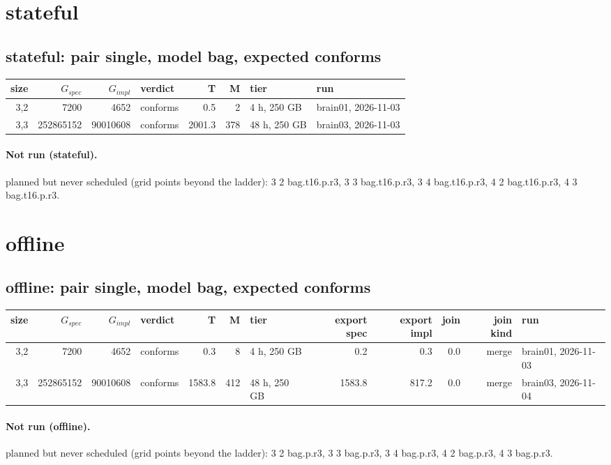 \documentclass[10pt]{article}
\begin{document}
\section*{stateful}
\subsection*{stateful: pair \textsf{single}, model bag, expected conforms}
\begin{longtable}{@{}rrrlrrll@{}}
\toprule
size & $G_{\mathit{spec}}$ & $G_{\mathit{impl}}$ & verdict & T & M & tier & run \\
\midrule
\endhead
\color{blue} 3,2 & 7200 & 4652 & conforms & 0.5 & 2 & 4 h, 250 GB & brain01, 2026-11-03 \\
\color{blue} 3,3 & 252865152 & 90010608 & conforms & 2001.3 & 378 & 48 h, 250 GB & brain03, 2026-11-03 \\
\bottomrule
\end{longtable}
\paragraph{Not run (stateful).}
planned but never scheduled (grid points beyond the ladder): 3 2 bag.t16.p.r3, 3 3 bag.t16.p.r3, 3 4 bag.t16.p.r3, 4 2 bag.t16.p.r3, 4 3 bag.t16.p.r3.\par
\section*{offline}
\subsection*{offline: pair \textsf{single}, model bag, expected conforms}
\begin{longtable}{@{}rrrlrrlrrrrl@{}}
\toprule
size & $G_{\mathit{spec}}$ & $G_{\mathit{impl}}$ & verdict & T & M & tier & export spec & export impl & join & join kind & run \\
\midrule
\endhead
\color{blue} 3,2 & 7200 & 4652 & conforms & 0.3 & 8 & 4 h, 250 GB & 0.2 & 0.3 & 0.0 & merge & brain01, 2026-11-03 \\
\color{blue} 3,3 & 252865152 & 90010608 & conforms & 1583.8 & 412 & 48 h, 250 GB & 1583.8 & 817.2 & 0.0 & merge & brain03, 2026-11-04 \\
\bottomrule
\end{longtable}
\paragraph{Not run (offline).}
planned but never scheduled (grid points beyond the ladder): 3 2 bag.p.r3, 3 3 bag.p.r3, 3 4 bag.p.r3, 4 2 bag.p.r3, 4 3 bag.p.r3.\par
\end{document}
